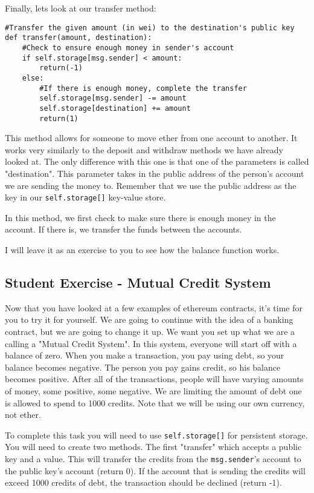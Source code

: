 \documentclass[12pt]{article}
\begin{document}
Finally, lets look at our transfer method:

\begin{verbatim}
#Transfer the given amount (in wei) to the destination's public key
def transfer(amount, destination):
	#Check to ensure enough money in sender's account
	if self.storage[msg.sender] < amount:
		return(-1)
	else:
		#If there is enough money, complete the transfer
		self.storage[msg.sender] -= amount
		self.storage[destination] += amount
		return(1)
\end{verbatim}

This method allows for someone to move ether from one account to another. It works very similarly to the deposit and withdraw methods we have already looked at. The only difference with this one is that one of the parameters is called "destination". This parameter takes in the public address of the person's account we are sending the money to. Remember that we use the public address as the key in our \texttt{self.storage[]} key-value store. 

In this method, we first check to make sure there is enough money in the account. If there is, we transfer the funds between the accounts. 

I will leave it as an exercise to you to see how the balance function works.  

\subsection{Student Exercise - Mutual Credit System}
Now that you have looked at a few examples of ethereum contracts, it's time for you to try it for yourself. We are going to continue with the idea of a banking contract, but we are going to change it up. We want you set up what we are a calling a "Mutual Credit System". In this system, everyone will start off with a balance of zero. When you make a transaction, you pay using debt, so your balance becomes negative. The person you pay gains credit, so his balance becomes positive. After all of the transactions, people will have varying amounts of money, some positive, some negative. We are limiting the amount of debt one is allowed to spend to 1000 credits. Note that we will be using our own currency, not ether.

To complete this task you will need to use \texttt{self.storage[]} for persistent storage. You will need to create two methods. The first "transfer" which accepts a public key and a value. This will transfer the credits from the \texttt{msg.sender}'s account to the public key's account (return 0). If the account that is sending the credits will exceed 1000 credits of debt, the transaction should be declined (return -1). 
\end{document}
